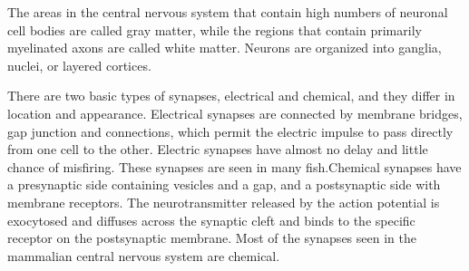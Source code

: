 The areas in the central nervous system that contain high numbers of neuronal cell bodies are
called gray matter, while the regions that contain primarily myelinated axons are called
white matter. Neurons are organized into ganglia, nuclei, or layered cortices.

There are two basic types of synapses, electrical and chemical, and they differ in location and 
appearance. Electrical synapses are connected by membrane bridges, gap junction and connections,
which permit the electric impulse to pass directly from one cell to the other.
Electric synapses have almost no delay and little chance of misfiring. These synapses are seen in 
many fish.Chemical synapses have a presynaptic side containing vesicles and a gap,
and a postsynaptic side with membrane receptors.
The neurotransmitter released by the action potential is exocytosed and diffuses across the 
synaptic cleft and binds to the specific receptor on the postsynaptic membrane.
Most of the synapses seen in the mammalian central nervous system are chemical.

